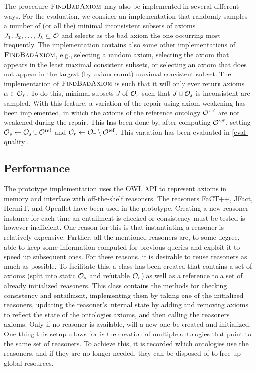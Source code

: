 The procedure $\textsc{FindBadAxiom}$ may also be implemented in several different ways. For the evaluation, we consider an implementation that randomly samples a number of (or all the) minimal inconsistent subsets of axioms $J_1, J_2, \dots, J_k \subseteq \mathcal{O}$ and selects as the bad axiom the one occurring most frequently. The implementation contains also some other implementations of $\textsc{FindBadAxiom}$, e.g., selecting a random axiom, selecting the axiom that appears in the least maximal consistent subsets, or selecting an axiom that does not appear in the largest (by axiom count) maximal consistent subset. The implementation of $\textsc{FindBadAxiom}$ is such that it will only ever return axioms $\alpha \in \mathcal{O}_r$. To do this, minimal subsets $J$ of $\mathcal{O}_r$ such that $J \cup \mathcal{O}_s$ is inconsistent are sampled. With this feature, a variation of the repair using axiom weakening has been implemented, in which the axioms of the reference ontology ${\mathcal{O}^\textnormal{ref}}$ are not weakened during the repair. This has been done by, after computing ${\mathcal{O}^\textnormal{ref}}$, setting $\mathcal{O}_s \gets \mathcal{O}_s \cup {\mathcal{O}^\textnormal{ref}}$ and $\mathcal{O}_r \gets \mathcal{O}_r \setminus {\mathcal{O}^\textnormal{ref}}$. This variation has been evaluated in \cref{eval-quality}.

\subsection{Performance}\label{performance-impl}

The prototype implementation uses the OWL API \cite{horridge2011owl,owlapi} to represent axioms in memory and interface with off-the-shelf reasoners. The reasoners FaCT++, JFact, HermiT, and Openllet have been used in the prototype. Creating a new reasoner instance for each time an entailment is checked or consistency must be tested is however inefficient. One reason for this is that instantiating a reasoner is relatively expensive. Further, all the mentioned reasoners are, to some degree, able to keep some information computed for previous queries and exploit it to speed up subsequent ones. For these reasons, it is desirable to reuse reasoners as much as possible. To facilitate this, a class  has been created that contains a set of axioms (split into static $\mathcal{O}_s$ and refutable $\mathcal{O}_r$) as well as a reference to a set of already initialized reasoners. This class contains the methods for checking consistency and entailment, implementing them by taking one of the initialized reasoners, updating the reasoner's internal state by adding and removing axioms to reflect the state of the ontologies axioms, and then calling the reasoners axioms. Only if no reasoner is available, will a new one be created and initialized. One thing this setup allows for is the creation of multiple ontologies that point to the same set of reasoners. To achieve this, it is recorded which ontologies use the reasoners, and if they are no longer needed, they can be disposed of to free up global resources.

